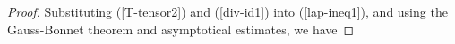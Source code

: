 \documentclass[letter]{amsart}
\theoremstyle{definition}
\theoremstyle{remark}
\begin{document}
\begin{proof}

Substituting (\ref{T-tensor2}) and (\ref{div-id1}) into (\ref{lap-ineq1}), and using the Gauss-Bonnet theorem and asymptotical estimates, we have

\end{proof}
\end{document}
